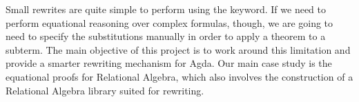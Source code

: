 Small rewrites are quite simple to perform using the  keyword. If we need to perform
equational reasoning over complex formulas, though, we are going to need to specify the
substitutions manually in order to apply a theorem to a subterm. The main objective of this project is
to work around this limitation and provide a smarter rewriting mechanism for Agda. Our main 
case study is the equational proofs for Relational Algebra, which also involves
the construction of a Relational Algebra library suited for rewriting.
